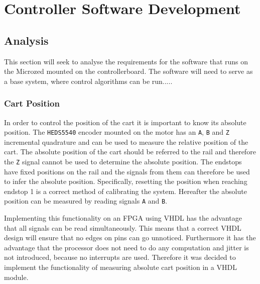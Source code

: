 \section{Controller Software Development} %
\label{sub:controller_board_software}

\subsection{Analysis} %
\label{sub:analysis}
This section will seek to analyse the requirements for the software that runs on the Microzed mounted on the controllerboard.
The software will need to serve as a base system, where control algorithms can be run.....


\subsubsection{Cart Position}
\label{ssub:cart_position}
In order to control the position of the cart it is important to know its absolute position.
The \texttt{HEDS5540} encoder mounted on the motor has an \texttt{A}, \texttt{B} and \texttt{Z} incremental quadrature and can be used to measure the relative position of the cart. 
The absolute position of the cart should be referred to the rail and therefore the \texttt{Z} signal cannot be used to determine the absolute position.
The endstops have fixed positions on the rail and the signals from them can therefore be used to infer the absolute position.
Specifically, resetting the position when reaching endstop 1 is a correct method of calibrating the system.
Hereafter the absolute position can be measured by reading signals \texttt{A} and \texttt{B}.

Implementing this functionality on an FPGA using VHDL has the advantage that all signals can be read simultaneously.
This means that a correct VHDL design will ensure that no edges on pins can go unnoticed.
Furthermore it has the advantage that the processor does not need to do any computation and jitter is not introduced, because no interrupts are used. 
Therefore it was decided to implement the functionality of measuring absolute cart position in a VHDL module.


